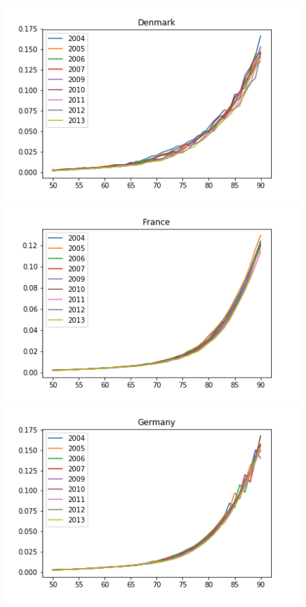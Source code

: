\begin{figure}[H]
  \includegraphics[width=\linewidth]{images/mortality_female_3.png}
\endminipage \hfill
{}
  \includegraphics[width=\linewidth]{images/mortality_female_4.png}
\endminipage\hfill
{}
  \includegraphics[width=\linewidth]{images/mortality_female_5.png}

\end{figure}
